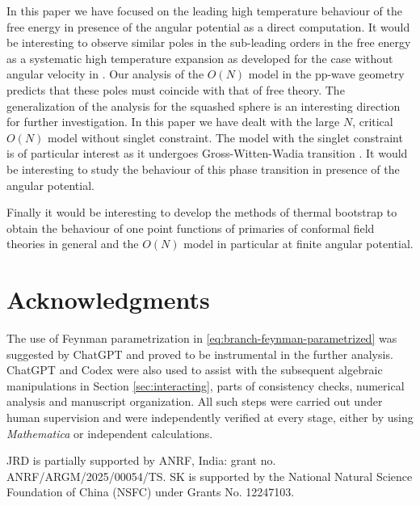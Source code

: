 \documentclass[a4paper,11pt]{article}
\begin{document}
In this paper we  have focused on the leading high temperature behaviour of the free energy in presence of the angular potential as a direct computation. It would be interesting to observe similar poles in the sub-leading orders  
in the free energy as a systematic high temperature expansion as developed for the case without angular velocity in 
\cite{David:2024pir}.  Our analysis of the $O(N)$ model in the pp-wave geometry  predicts that these poles must coincide with that 
of  free theory. 
The generalization of the analysis   for the squashed sphere \cite{Parmentier:2026aqh} is an  interesting direction for further investigation. 
In this paper  we have dealt with the large $N$, critical $O(N)$ model without singlet constraint. The model with the singlet constraint is of particular interest as it undergoes Gross-Witten-Wadia transition \cite{Shenker:2011zf}. 
It would be interesting to  study the behaviour of this  phase transition in presence of the angular potential.

Finally it would be interesting to develop the methods of thermal bootstrap to obtain the behaviour of one point functions of  primaries 
of conformal field theories in general and the $O(N)$ model in particular  at finite angular potential. 











\section*{Acknowledgments}
The use of Feynman parametrization in \eqref{eq:branch-feynman-parametrized} was suggested by ChatGPT and proved to be instrumental in the further analysis.
 ChatGPT and Codex were also used to assist with the subsequent algebraic manipulations in Section \ref{sec:interacting}, parts of consistency checks, numerical analysis and  manuscript organization. 
 All such steps were carried out under human supervision and were independently verified at every stage, either by  using \textit{Mathematica} or independent calculations.
 
JRD is partially supported by ANRF, India: grant no. ANRF/ARGM/2025/00054/TS. SK is supported by the National Natural Science Foundation of China (NSFC) under Grants No. 12247103.
\end{document}
